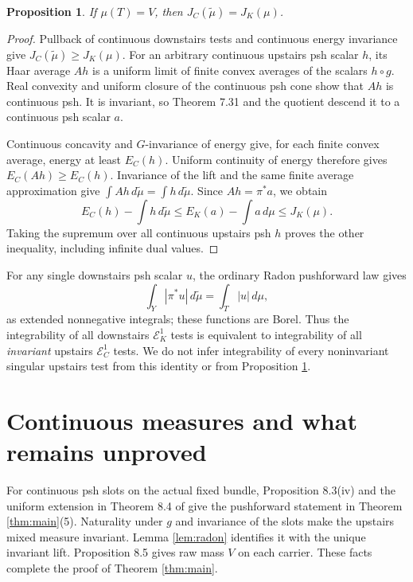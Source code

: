 \documentclass[11pt]{article}
\newtheorem{proposition}[theorem]{Proposition}
\theoremstyle{remark}
\newcommand{\E}{\mathcal E}
\begin{document}
\begin{proposition}\label{prop:dual}
If $\mu(T)=V$, then $J_C(\widetilde\mu)=J_K(\mu)$.
\end{proposition}
\begin{proof}
Pullback of continuous downstairs tests and continuous energy
invariance give $J_C(\widetilde\mu)\geq J_K(\mu)$.
For an arbitrary continuous upstairs psh scalar $h$, its Haar average
$Ah$ is a uniform limit of finite convex averages of the scalars
$h\circ g$. Real convexity and uniform closure of the continuous psh
cone show that $Ah$ is continuous psh. It is invariant, so Theorem
7.31 and the quotient descend it to a continuous psh scalar $a$.

Continuous concavity and $G$-invariance of energy give, for each
finite convex average, energy at least $E_C(h)$. Uniform continuity
of energy therefore gives
$E_C(Ah)\geq E_C(h)$. Invariance of the lift and the same finite
average approximation give
$\int Ah\,d\widetilde\mu=\int h\,d\widetilde\mu$.
Since $Ah=\pi^*a$, we obtain
\[
 E_C(h)-\int h\,d\widetilde\mu
 \leq E_K(a)-\int a\,d\mu\leq J_K(\mu).
\]
Taking the supremum over all continuous upstairs psh $h$ proves the
other inequality, including infinite dual values.
\end{proof}

For any single downstairs psh scalar $u$, the ordinary Radon
pushforward law gives
\[
 \int_Y |\pi^*u|\,d\widetilde\mu=
 \int_T |u|\,d\mu,
\]
as extended nonnegative integrals; these functions are Borel. Thus
the integrability of all downstairs $\E_K^1$ tests is equivalent to
integrability of all \emph{invariant} upstairs $\E_C^1$ tests.
We do not infer integrability of every noninvariant singular upstairs
test from this identity or from Proposition \ref{prop:dual}.

\section{Continuous measures and what remains unproved}

For continuous psh slots on the actual fixed bundle, Proposition
8.3(iv) and the uniform extension in Theorem 8.4 of \cite{BE} give
the pushforward statement in Theorem \ref{thm:main}(5). Naturality
under $g$ and invariance of the slots make the upstairs mixed measure
invariant. Lemma \ref{lem:radon} identifies it with the unique
invariant lift. Proposition 8.5 gives raw mass $V$ on each carrier.
These facts complete the proof of Theorem \ref{thm:main}.
\end{document}
